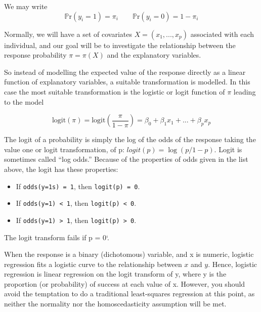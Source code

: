 \documentclass[]{article}
\def\tightlist{}
\numberwithin{equation}{section}
\begin{document}
We may write \[
\mathbb{P}\mbox{r}(y_i=1)=\pi_i \qquad \mathbb{P}\mbox{r}(y_i=0)=1-\pi_i
\]

Normally, we will have a set of covariates \(X=(x_1,..., x_p)\)
associated with each individual, and our goal will be to investigate the
relationship between the response probability \(\pi=\pi(X)\) and the
explanatory variables.

So instead of modelling the expected value of the response directly as a
linear function of explanatory variables, a suitable transformation is
modelled. In this case the most suitable transformation is the logistic
or logit function of \(\pi\) leading to the model

\[
  \mbox{logit}(\pi) = \mbox{logit}\left(\frac{\pi}{1-\pi}\right) = \beta_0 + \beta_1x_1 + ... + \beta_p x_p
\]

The logit of a probability is simply the log of the odds of the response
taking the value one or logit transformation, of p:
\(logit(p) = \log(p/1-p)\). Logit is sometimes called ``log odds.''
Because of the properties of odds given in the list above, the logit has
these properties:

\begin{itemize}
\tightlist
\item
  If \texttt{odds(y=1s)\ =\ 1}, then \texttt{logit(p)\ =\ 0}.
\item
  If \texttt{odds(y=1)\ \textless{}\ 1}, then
  \texttt{logit(p)\ \textless{}\ 0}.
\item
  If \texttt{odds(y=1)\ \textgreater{}\ 1}, then
  \texttt{logit(p)\ \textgreater{}\ 0}.
\end{itemize}

The logit transform fails if p = 0`.

When the response is a binary (dichotomous) variable, and x is numeric,
logistic regression fits a logistic curve to the relationship between
\(x\) and \(y\). Hence, logistic regression is linear regression on the
logit transform of y, where y is the proportion (or probability) of
success at each value of x. However, you should avoid the temptation to
do a traditional least-squares regression at this point, as neither the
normality nor the homoscedasticity assumption will be met.
\end{document}
